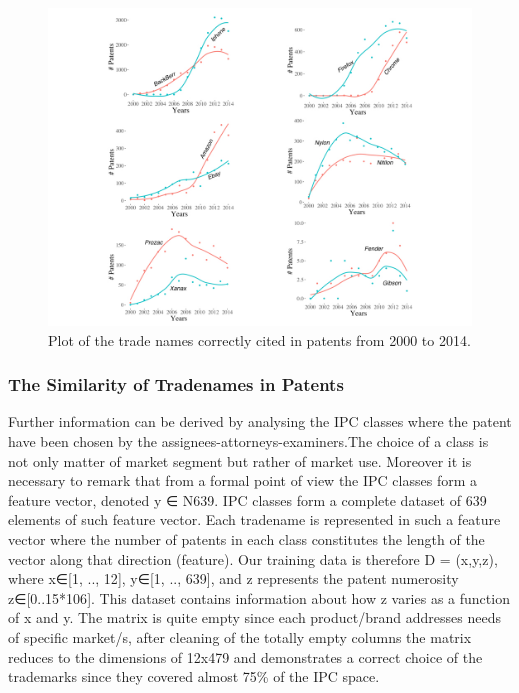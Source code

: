 \documentclass[b5paper,]{book}
\theoremstyle{definition}
\theoremstyle{definition}
\theoremstyle{definition}
\theoremstyle{remark}
\begin{document}
\begin{figure}

{\centering \includegraphics[width=0.8\linewidth]{_bookdown_files/figures/Marks_Years} 

}

\caption{Plot of the trade names correctly cited in patents from 2000 to 2014.}\label{fig:populartm}
\end{figure}

\subsubsection*{The Similarity of Tradenames in
Patents}\label{the-similarity-of-tradenames-in-patents}

Further information can be derived by analysing the IPC classes where
the patent have been chosen by the assignees-attorneys-examiners.The
choice of a class is not only matter of market segment but rather of
market use. Moreover it is necessary to remark that from a formal point
of view the IPC classes form a feature vector, denoted y ∈ N639. IPC
classes form a complete dataset of 639 elements of such feature vector.
Each tradename is represented in such a feature vector where the number
of patents in each class constitutes the length of the vector along that
direction (feature). Our training data is therefore D = (x,y,z), where
x∈{[}1, .., 12{]}, y∈{[}1, .., 639{]}, and z represents the patent
numerosity z∈{[}0..15*106{]}. This dataset contains information about
how z varies as a function of x and y. The matrix is quite empty since
each product/brand addresses needs of specific market/s, after cleaning
of the totally empty columns the matrix reduces to the dimensions of
12x479 and demonstrates a correct choice of the trademarks since they
covered almost 75\% of the IPC space.
\end{document}
